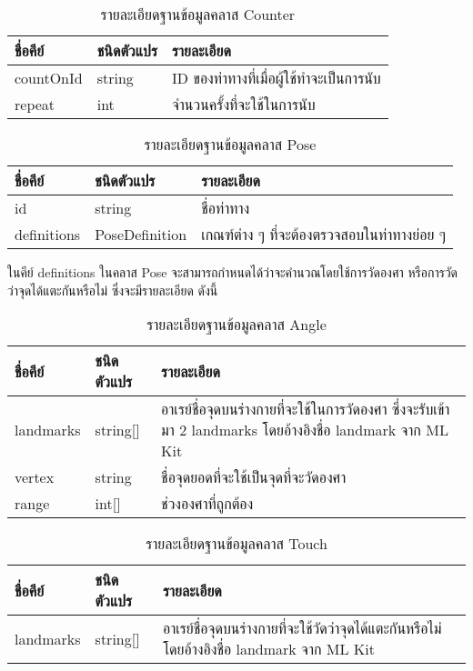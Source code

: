 \begin{table}
    \caption{รายละเอียดฐานข้อมูลคลาส Counter}
    \begin{tabularx}{\textwidth}{ | l | l | X | }
        \hline
        \bf ชื่อคีย์			& \bf ชนิดตัวแปร		& \bf รายละเอียด    \\\hline
        countOnId			& string			& ID ของท่าทางที่เมื่อผู้ใช้ทำจะเป็นการนับ\\\hline
        repeat				& int				& จำนวนครั้งที่จะใช้ในการนับ \\\hline
    \end{tabularx}
\end{table}

\begin{table}
    \caption{รายละเอียดฐานข้อมูลคลาส Pose}
    \begin{tabularx}{\textwidth}{ | l | l | X | }
        \hline
        \bf ชื่อคีย์			& \bf ชนิดตัวแปร		& \bf รายละเอียด    \\\hline
        id					& string			& ชื่อท่าทาง           \\\hline
        definitions			& PoseDefinition	& เกณฑ์ต่าง ๆ ที่จะต้องตรวจสอบในท่าทางย่อย ๆ \\\hline
    \end{tabularx}
\end{table}

ในคีย์ definitions ในคลาส Pose จะสามารถกำหนดได้ว่าจะคำนวณโดยใช้การวัดองศา หรือการวัดว่าจุดได้แตะกันหรือไม่ ซึ่งจะมีรายละเอียด ดังนี้
\begin{table}
    \caption{รายละเอียดฐานข้อมูลคลาส Angle}
    \begin{tabularx}{\textwidth}{ | l | l | X | }
        \hline
        \bf ชื่อคีย์			& \bf ชนิดตัวแปร		& \bf รายละเอียด    \\\hline
        landmarks			& string[]			& อาเรย์ชื่อจุดบนร่างกายที่จะใช้ในการวัดองศา ซึ่งจะรับเข้ามา 2 landmarks โดยอ้างอิงชื่อ landmark จาก ML Kit\\\hline
        vertex				& string			& ชื่อจุดยอดที่จะใช้เป็นจุดที่จะวัดองศา\\\hline
        range				& int[]				& ช่วงองศาที่ถูกต้อง\\\hline
    \end{tabularx}
\end{table}

\begin{table}
    \caption{รายละเอียดฐานข้อมูลคลาส Touch}
    \begin{tabularx}{\textwidth}{ | l | l | X | }
        \hline
        \bf ชื่อคีย์			& \bf ชนิดตัวแปร		& \bf รายละเอียด    \\\hline
        landmarks			& string[]			& อาเรย์ชื่อจุดบนร่างกายที่จะใช้วัดว่าจุดได้แตะกันหรือไม่ โดยอ้างอิงชื่อ landmark จาก ML Kit\\\hline
    \end{tabularx}
\end{table}

